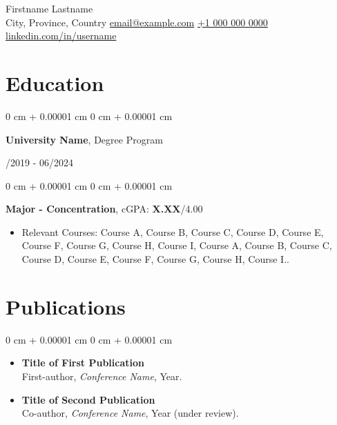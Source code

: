 \documentclass[11pt, letterpaper]{article}
\makeatletter
\newenvironment{highlights}{
    \begin{itemize}[
        topsep=0.08 cm,
        parsep=0.08 cm,
        partopsep=0pt,
        itemsep=0pt,
        leftmargin=0.2 cm + 17pt
    ]
}
{
    \end{itemize}
}
\newenvironment{onecolentry}{
    \begin{adjustwidth}{
        0 cm + 0.00001 cm
    }{
        0 cm + 0.00001 cm
    }
}{
    \end{adjustwidth}
}
\newenvironment{twocolentry}[2][]{
    \onecolentry
    \def\secondColumn{#2}
    \setcolumnwidth{\fill, 4.5 cm}
    \begin{paracol}{2}
}{
    \switchcolumn \raggedleft \secondColumn
    \end{paracol}
    \endonecolentry
}
\newcommand{\contactinfo}{
    \centering
    {\fontsize{25pt}{25pt}\selectfont Firstname Lastname} \\[4pt]
    \vspace{0.3cm}
    \small City, Province, Country \hfill 
    \href{mailto:email@example.com}{email@example.com} \hfill 
    \href{tel:+1-000-000-0000}{+1 000 000 0000} \hfill 
    \href{https://www.linkedin.com/in/username}{linkedin.com/in/username} \\
}
\makeatother
\begin{document}
\contactinfo
\vspace{2pt}

\section{Education}
\vspace{0.08 cm}
\begin{twocolentry}{09/2019 - 06/2024}
    {\textbf{University Name}}, Degree Program
\end{twocolentry}
\vspace{0.11cm}
\begin{onecolentry}
\hspace{0.3cm}\textbf{Major - Concentration},  cGPA: {\textbf{X.XX}}/4.00
\vspace{0.07cm}
    \begin{highlights}
        \item Relevant Courses: Course A, Course B, Course C, Course D, Course E, Course F, Course G, Course H, Course I, Course A, Course B, Course C, Course D, Course E, Course F, Course G, Course H, Course I..
    \end{highlights}
\end{onecolentry}

\section{Publications}
\vspace{0.08 cm}
\begin{onecolentry}
    \begin{highlights}
    \item \textbf{Title of First Publication} \\
    First-author, \textit{Conference Name}, Year. 
    \vspace{0.1cm}
    \item \textbf{Title of Second Publication} \\
    Co-author, \textit{Conference Name}, Year (under review).
    \end{highlights}
\end{onecolentry}
\end{document}
